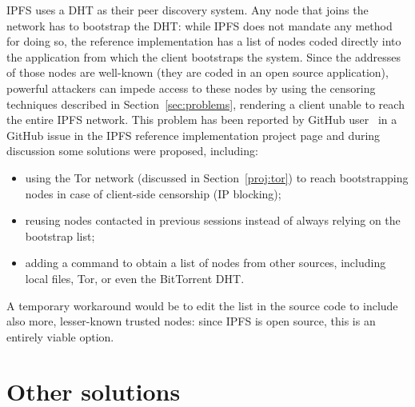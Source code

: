 \documentclass[mscthesis]{usiinfthesis}
\begin{document}
IPFS uses a DHT as their peer discovery system. Any node that joins the network has to bootstrap the DHT: while IPFS does not mandate any method for doing so, the reference implementation has a list of nodes coded directly into the application from which the client bootstraps the system. Since the addresses of those nodes are well-known (they are coded in an open source application), powerful attackers can impede access to these nodes by using the censoring techniques described in Section~\ref{sec:problems}, rendering a client unable to reach the entire IPFS network. This problem has been reported by GitHub user~\cite{website:ipfsbootstrap} in a GitHub issue in the IPFS reference implementation project page and during discussion some solutions were proposed, including:
\begin{itemize}
	\item using the Tor network (discussed in Section~\ref{proj:tor}) to reach bootstrapping nodes in case of client-side censorship (IP blocking);
	\item reusing nodes contacted in previous sessions instead of always relying on the bootstrap list;
	\item adding a command to obtain a list of nodes from other sources, including local files, Tor, or even the BitTorrent DHT.
\end{itemize}
A temporary workaround would be to edit the list in the source code to include also more, lesser-known trusted nodes: since IPFS is open source, this is an entirely viable option.

\section{Other solutions}\label{sec:storageprojects}
\end{document}
